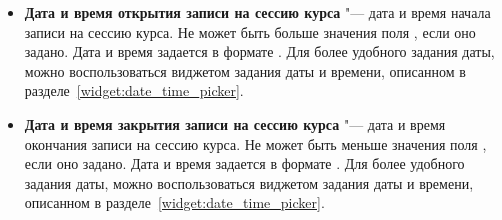 \begin{itemize}
		\item \textbf{Дата и время открытия записи на сессию курса} "--- дата и время начала записи на сессию курса. Не может быть больше значения поля , если оно задано. Дата и время задается в формате . Для более удобного задания даты, можно воспользоваться виджетом задания даты и времени, описанном в разделе~\ref{widget:date_time_picker}.
		
		\item \textbf{Дата и время закрытия записи на сессию курса} "--- дата и время окончания записи на сессию курса. Не может быть меньше значения поля , если оно задано. Дата и время задается в формате . Для более удобного задания даты, можно воспользоваться виджетом задания даты и времени, описанном в разделе~\ref{widget:date_time_picker}.
		

\end{itemize}
